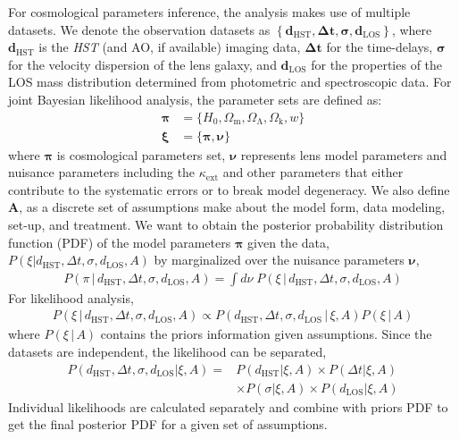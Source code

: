\documentclass{cosmo}
\begin{document}
    For cosmological parameters inference, the analysis makes use of multiple datasets. We denote the observation datasets as $\left\{ \boldsymbol{d_\mathrm{HST}, \Delta t, \sigma, d_\mathrm{LOS}} \right\}$, where $\boldsymbol{d_\mathrm{HST}}$ is the \textit{HST} (and AO, if available) imaging data, $\boldsymbol{\Delta t}$ for the time-delays, $\boldsymbol{\sigma}$ for the velocity dispersion of the lens galaxy, and $\boldsymbol{d_\mathrm{LOS}}$ for the properties of the LOS mass distribution determined from photometric and spectroscopic data. For joint Bayesian likelihood analysis, the parameter sets are defined as:
    \begin{align*}
        \boldsymbol{\pi} &= \{H_\mathrm{0}, \Omega_\mathrm{m}, \Omega_\mathrm{\Lambda}, \Omega_\mathrm{k}, w \} \\
        \boldsymbol{\xi} &= \{\boldsymbol{\pi}, \boldsymbol{\nu}\}
    \end{align*}
    where $\boldsymbol{\pi}$ is cosmological parameters set, $\boldsymbol{\nu}$ represents lens model parameters and nuisance parameters including the $\kappa_\mathrm{ext}$ and other parameters that either contribute to the systematic errors or to break model degeneracy. We also define $\boldsymbol{A}$, as a discrete set of assumptions make about the model form, data modeling, set-up, and treatment. We want to obtain the posterior probability distribution function (PDF) of the model parameters $\boldsymbol{\pi}$ given the data, $P(\xi|d_\mathrm{HST}, \Delta t, \sigma, d_\mathrm{LOS}, A)$ by marginalized over the nuisance parameters $\boldsymbol{\nu}$, 
    \begin{align*}
        P(\pi\,|\,d_\mathrm{HST}, \Delta t, \sigma, d_\mathrm{LOS}, A) = \int d\nu\;P(\xi\,|\,d_\mathrm{HST}, \Delta t, \sigma, d_\mathrm{LOS}, A)
    \end{align*}
    For likelihood analysis, 
    \begin{align*}
        P(\xi\,|\,d_\mathrm{HST}, \Delta t, \sigma, d_\mathrm{LOS}, A) \propto P(d_\mathrm{HST}, \Delta t, \sigma, d_\mathrm{LOS}\,|\,\xi, A)P(\xi\,|\,A) 
    \end{align*}
    where $P(\xi\,|\,A)$ contains the priors information given assumptions. Since the datasets are independent, the likelihood can be separated,
    \begin{align*}
        P(d_\mathrm{HST}, \Delta t, \sigma, d_\mathrm{LOS}|\xi, A) = & P(d_\mathrm{HST}|\xi, A) \times P(\Delta t|\xi, A)\\ 
        & \times P(\sigma|\xi, A) \times P(d_\mathrm{LOS}|\xi, A)
    \end{align*}
    Individual likelihoods are calculated separately and combine with priors PDF to get the final posterior PDF for a given set of assumptions. 
    
\end{document}

